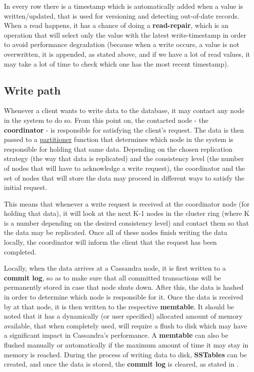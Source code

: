 \documentclass[runningheads]{llncs}
\begin{document}
In every row there is a timestamp which is automatically added when a value is written/updated, that is used for versioning and detecting out-of-date records. When a read happens, it has a chance of doing a \textbf{read-repair}, which is an operation that will select only the value with the latest write-timestamp in order to avoid performance degradation (because when a write occurs, a value is not overwritten, it is appended, as stated above, and if we have a lot of read values, it may take a lot of time to check which one has the most recent timestamp).\par

\subsection{Write path}
Whenever a client wants to write data to the database, it may contact any node in the system to do so. From this point on, the contacted node - the \textbf{coordinator} - is responsible for satisfying the client's request.
The data is then passed to a \underline{partitioner} function that determines which node in the system is responsible for holding that same data. Depending on the chosen replication strategy (the way that data is replicated) and the consistency level (the number of nodes that will have to acknowledge a write request), the coordinator and the set of nodes that will store the data may proceed in different ways to satisfy the initial request.\par

This means that whenever a write request is received at the coordinator node (for holding that data), it will look at the next K-1 nodes in the cluster ring (where K is a number depending on the desired consistency level) and contact them so that the data may be replicated. Once all of these nodes finish writing the data locally, the coordinator will inform the client that the request has been completed. \par

Locally, when the data arrives at a Cassandra node, it is first written to a \textbf{commit log}, so as to make sure that all committed transactions will be permanently stored in case that node shuts down. After this, the data is hashed in order to determine which node is responsible for it.
Once the data is received by at that node, it is then written to the respective \textbf{memtable}. It should be noted that it has a dynamically (or user specified) allocated amount of memory available, that when completely used, will require a flush to disk which may have a significant impact in Cassandra's performance. A \textbf{memtable} can also be flushed manually or automatically if the maximum amount of time it may stay in memory is reached. During the process of writing data to disk, \textbf{SSTables} can be created, and once the data is stored, the \textbf{commit log} is cleared, as stated in \cite{dzone}.\par
\end{document}
